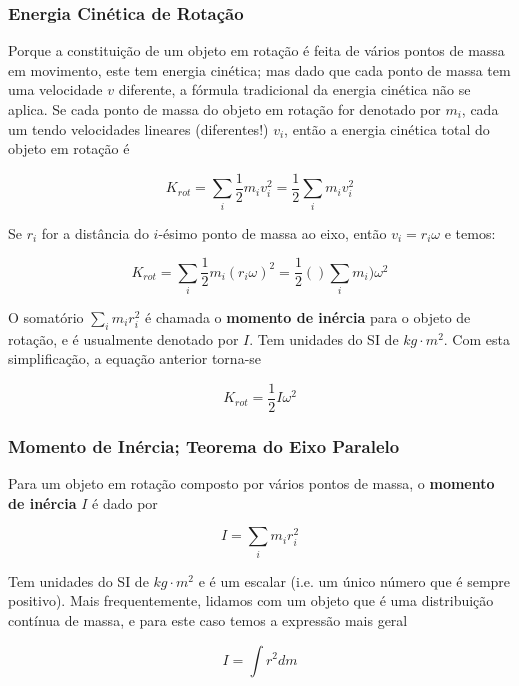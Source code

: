 \subsubsection{Energia Cinética de Rotação}
Porque a constituição de um objeto em rotação é feita de vários pontos de massa em movimento, este tem energia cinética; mas dado que cada ponto de massa tem uma velocidade $v$ diferente, a fórmula tradicional da energia cinética não se aplica. Se cada ponto de massa do objeto em rotação for denotado por $m_i$, cada um tendo velocidades lineares (diferentes!) $v_i$, então a energia cinética total do objeto em rotação é

\begin{equation}
    K_{rot}=\sum_{i}\frac{1}{2}m_iv_i^2=\frac{1}{2}\sum_i m_iv_i^2
\end{equation}

Se $r_i$ for a distância do $i$-ésimo ponto de massa ao eixo, então $v_i=r_i\omega$ e temos:

\begin{equation}
    K_{rot}=\sum_{i}\frac{1}{2}m_i(r_i\omega)^2=\frac{1}{2}()\sum_i m_i)\omega^2
\end{equation}

O somatório $\sum_i m_ir_i^2$ é chamada o \textbf{momento de inércia} para o objeto de rotação, e é usualmente denotado por $I$. Tem unidades do SI de $kg\cdot m^2$. Com esta simplificação, a equação anterior torna-se

\begin{equation}
    K_{rot}=\frac{1}{2}I\omega^2
\end{equation}

\subsubsection{Momento de Inércia; Teorema do Eixo Paralelo}
Para um objeto em rotação composto por vários pontos de massa, o \textbf{momento de inércia} $I$ é dado por

\begin{equation}
    I=\sum_i m_ir_i^2
\end{equation}

Tem unidades do SI de $kg\cdot m^2$ e é um escalar (i.e. um único número que é sempre positivo). Mais frequentemente, lidamos com um objeto que é uma distribuição contínua de massa, e para este caso temos a expressão mais geral

\begin{equation}
    I=\int r^2dm
\end{equation}

